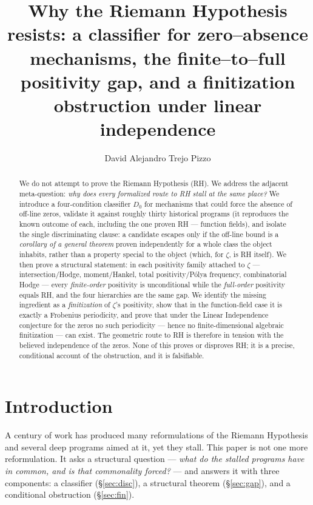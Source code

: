 \documentclass[11pt]{amsart}
\title[Why RH Resists]{Why the Riemann Hypothesis resists: a classifier for zero--absence
mechanisms, the finite--to--full positivity gap, and a finitization
obstruction under linear independence}
\author{David Alejandro Trejo Pizzo}
\theoremstyle{definition}
\theoremstyle{remark}
\begin{document}
\nocite{bgTitchmarsh,bgEdwards,bgConrey03,bgBombieri00,bgConnes99,bgdeBranges,bgMont73,bgKS}
\begin{abstract}
We do not attempt to prove the Riemann Hypothesis (RH). We address the
adjacent meta-question: \emph{why does every formalized route to RH stall at
the same place?} We introduce a four-condition classifier $D_0$ for
mechanisms that could force the absence of off-line zeros, validate it against
roughly thirty historical programs (it reproduces the known outcome of each,
including the one proven RH --- function fields), and isolate the single
discriminating clause: a candidate escapes only if the off-line bound is a
\emph{corollary of a general theorem} proven independently for a whole class
the object inhabits, rather than a property special to the object (which, for
$\zeta$, is RH itself). We then prove a structural statement: in each
positivity family attached to $\zeta$ --- intersection/Hodge, moment/Hankel,
total positivity/P\'olya frequency, combinatorial Hodge --- every
\emph{finite-order} positivity is unconditional while the \emph{full-order}
positivity equals RH, and the four hierarchies are the same gap. We identify
the missing ingredient as a \emph{finitization} of $\zeta$'s positivity, show
that in the function-field case it is exactly a Frobenius periodicity, and
prove that under the Linear Independence conjecture for the zeros no such
periodicity --- hence no finite-dimensional algebraic finitization --- can
exist. The geometric route to RH is therefore in tension with the believed
independence of the zeros. None of this proves or disproves RH; it is a
precise, conditional account of the obstruction, and it is falsifiable.
\end{abstract}
\maketitle

\tableofcontents
\newpage

\section{Introduction}
A century of work has produced many reformulations of the Riemann Hypothesis
and several deep programs aimed at it, yet they stall. This paper is not one
more reformulation. It asks a structural question --- \emph{what do the stalled
programs have in common, and is that commonality forced?} --- and answers it
with three components: a classifier (\S\ref{sec:disc}), a structural theorem
(\S\ref{sec:gap}), and a conditional obstruction (\S\ref{sec:fin}).
\end{document}
